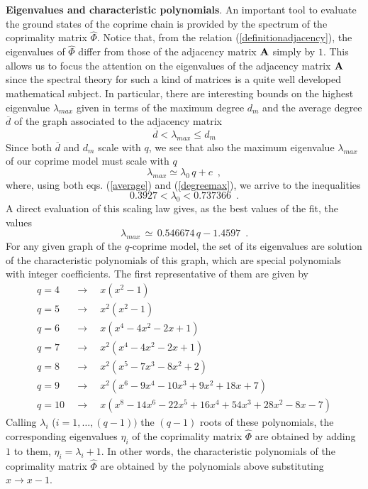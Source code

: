 \documentclass[aps,pra,superscriptaddress]{revtex4}
\newcommand\be            {\begin{equation}}
\newcommand\ee            {\end{equation}}
\renewcommand{\(}{\left(}
\renewcommand{\)}{\right)}
\renewcommand{\[}{\left[}
\renewcommand{\]}{\right]}
\begin{document}
\vspace{3mm}
\noindent
{\bf Eigenvalues and characteristic polynomials}. An important tool to evaluate the ground states of the coprime chain is provided by the spectrum of 
the coprimality matrix $\widehat \Phi$. Notice that, from the relation (\ref{definitionadjacency}), the eigenvalues of $\widehat\Phi$ differ from those of the adjacency matrix ${\bf A}$ simply by $1$. This allows us to focus the attention on the eigenvalues of the adjacency matrix ${\bf A}$ since the spectral theory for such a kind of matrices is a quite well developed mathematical subject. In particular, there are interesting bounds on the highest eigenvalue $\lambda_{max}$ given in terms of the maximum degree $d_m$ and the average degree ${\overline d}$ of the graph associated to the adjacency matrix 
\be 
{\overline d} < \lambda_{max} \leq d_{m} 
\ee 
Since both ${\overline d}$ and $d_m$ scale with $q$, we see that also the maximum eigenvalue $\lambda_{max}$ of our coprime model must scale with $q$ 
\be
\lambda_{max} \simeq \lambda_0 \, q + c \,\,\,,
\ee
where, using both eqs. (\ref{average}) and (\ref{degreemax}), we arrive to the inequalities 
\be 
0.3927 < \lambda_0 < 0.737366 \,\,\,.
\ee 
A direct evaluation of this scaling law gives, as the best values of the fit, the values
\be 
\lambda_{max} \,\simeq  \,  0.546674 \,q - 1.4597\,\,\,. 
\label{scalingmaxeig}
\ee
For any given graph of the $q$-coprime model, the set of its eigenvalues are solution of the characteristic polynomials of this graph, 
which are special polynomials with integer coefficients. The first representative of them are given by 
\be
\begin{array}{lll}
q = 4 & \,\,\,\longrightarrow \,\,\,& x (x^2 -1)\\ 
q = 5 & \,\,\,\longrightarrow \,\,\,&  x^2( x^2-1) \\
q =6 & \,\,\,\longrightarrow \,\,\,& x (x^4 - 4 x^2 - 2 x +1) 
\\
q =7 & \,\,\,\longrightarrow \,\,\,& x^2 ( x^4 - 4 x^2 - 2 x +1) \\
q = 8 &\,\,\,\longrightarrow \,\,\, & x^2 (x^5 - 7 x^3 - 8 x^2 +2) \\
q = 9 &\,\,\,\longrightarrow \,\,\, & x^2 (x^6 - 9 x^4 - 10 x^3 + 9 x^2 + 18 x + 7) \\
q =10 & \,\,\,\longrightarrow \,\,\,& x (x^8 - 14 x^6 - 22 x^5 + 16 x^4 + 54 x^3 + 28 x^2 - 8 x - 7) 
\end{array}
\label{polynchar}
\ee
Calling $\lambda_i$ ($i=1,\ldots , (q-1))$ the $(q-1)$ roots of these polynomials, the corresponding eigenvalues $\eta_i$ of the coprimality matrix $\widehat\Phi$ are obtained by adding $1$ to them, $\eta_i = \lambda_i +1$. In other words, the characteristic polynomials of the coprimality matrix $\widehat\Phi$ 
are obtained by the polynomials above substituting $x \rightarrow x-1$. 
\end{document}
